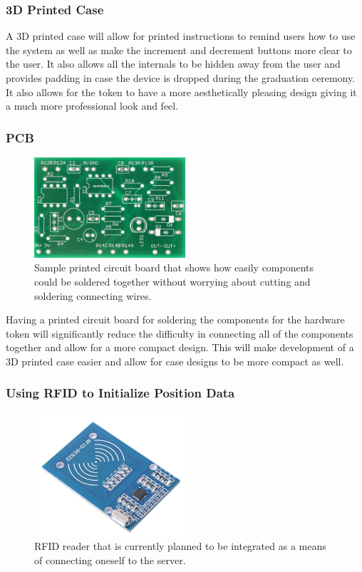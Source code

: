 \documentclass[a4paper,10pt]{article}
\begin{document}
\subsubsection{3D Printed Case}
A 3D printed case will allow for printed instructions to remind users how to use the system as well as make the increment and decrement buttons more clear to the user. It also allows all the internals to be hidden away from the user and provides padding in case the device is dropped during the graduation ceremony. It also allows for the token to have a more aesthetically pleasing design giving it a much more professional look and feel.

\subsubsection{PCB}
\begin{figure}[H]
  \centering
      \includegraphics[width=0.5\textwidth]{Assets/PCB.png}
  \caption{Sample printed circuit board that shows how easily components could be soldered together without worrying about cutting and soldering connecting wires.}
\end{figure}

Having a printed circuit board for soldering the components for the hardware token will significantly reduce the difficulty in connecting all of the components together and allow for a more compact design. This will make development of a 3D printed case easier and allow for case designs to be more compact as well.

\subsubsection{Using RFID to Initialize Position Data}
\begin{figure}[H]
  \centering
      \includegraphics[width=0.5\textwidth]{Assets/RFID.png}
  \caption{RFID reader that is currently planned to be integrated as a means of connecting oneself to the server.}
\end{figure}
\end{document}

